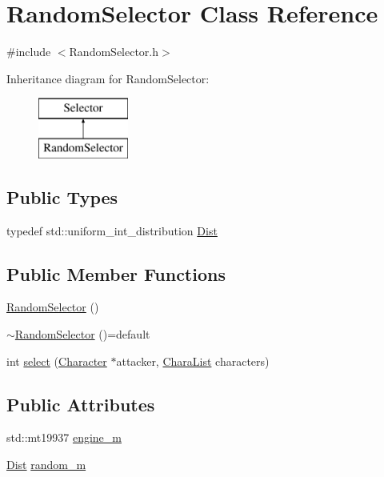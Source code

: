 \hypertarget{class_random_selector}{}\section{Random\+Selector Class Reference}
\label{class_random_selector}


{\ttfamily \#include $<$Random\+Selector.\+h$>$}

Inheritance diagram for Random\+Selector\+:\begin{figure}[H]
\begin{center}
\leavevmode
\includegraphics[height=2.000000cm]{class_random_selector}
\end{center}
\end{figure}
\subsection*{Public Types}
\begin{DoxyCompactItemize}
\item 
typedef std\+::uniform\+\_\+int\+\_\+distribution \hyperlink{class_random_selector_aa19efc61b8b330971db574f39e4f623b}{Dist}
\end{DoxyCompactItemize}
\subsection*{Public Member Functions}
\begin{DoxyCompactItemize}
\item 
\hyperlink{class_random_selector_a9711b846989394963835acfd4da8b7aa}{Random\+Selector} ()
\item 
\hyperlink{class_random_selector_a19c6e54d2055c7e317c128e1d8c72ffe}{$\sim$\+Random\+Selector} ()=default
\item 
int \hyperlink{class_random_selector_ab5d7b7d795cdae3f329484c1d305e9e1}{select} (\hyperlink{class_character}{Character} $\ast$attacker, \hyperlink{_character_8h_ac22f543a628d2695d0297c399b0272d8}{Chara\+List} characters)
\end{DoxyCompactItemize}
\subsection*{Public Attributes}
\begin{DoxyCompactItemize}
\item 
std\+::mt19937 \hyperlink{class_random_selector_a141cf5ff4752ece62b71a880501601b3}{engine\+\_\+m}
\item 
\hyperlink{class_random_selector_aa19efc61b8b330971db574f39e4f623b}{Dist} \hyperlink{class_random_selector_adbb8b79d964616048efb5554da2eb561}{random\+\_\+m}
\end{DoxyCompactItemize}


